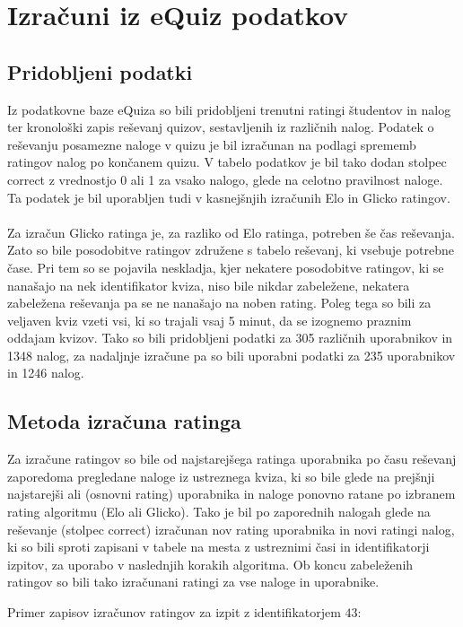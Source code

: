 \documentclass{IEEEtran}
\makeatletter
\let\old@subsection\subsection
\renewcommand{\subsection}[1]{\bigskip\old@subsection{#1}\@afterindentfalse\@afterheading}
\makeatother
\begin{document}
\section{Izračuni iz eQuiz podatkov}
\label{sec:izracuni}
\subsection{Pridobljeni podatki}
Iz podatkovne baze eQuiza so bili pridobljeni trenutni ratingi študentov in nalog ter kronološki zapis reševanj quizov, sestavljenih iz različnih nalog. Podatek o reševanju posamezne naloge v quizu je bil izračunan na podlagi sprememb ratingov nalog po končanem quizu. V tabelo podatkov je bil tako dodan stolpec correct z vrednostjo 0 ali 1 za vsako nalogo, glede na celotno pravilnost naloge. Ta podatek je bil uporabljen tudi v kasnejšnjih izračunih Elo in Glicko ratingov.
\hfill
\\
\\
Za izračun Glicko ratinga je, za razliko od Elo ratinga, potreben še čas reševanja. Zato so bile posodobitve ratingov združene s tabelo reševanj, ki vsebuje potrebne čase. Pri tem so se pojavila neskladja, kjer nekatere posodobitve ratingov, ki se nanašajo na nek identifikator kviza, niso bile nikdar zabeležene, nekatera zabeležena reševanja pa se ne nanašajo na noben rating. Poleg tega so bili za veljaven kviz vzeti vsi, ki so trajali vsaj 5 minut, da se izognemo praznim oddajam kvizov. Tako so bili pridobljeni podatki za 305 različnih uporabnikov in 1348 nalog, za nadaljnje izračune pa so bili uporabni podatki za 235 uporabnikov in 1246 nalog.
\hfill
\\

\subsection{Metoda izračuna ratinga}
Za izračune ratingov so bile od najstarejšega ratinga uporabnika po času reševanj zaporedoma pregledane naloge iz ustreznega kviza, ki so bile glede na prejšnji najstarejši ali (osnovni rating) uporabnika in naloge ponovno ratane po izbranem rating algoritmu (Elo ali Glicko). Tako je bil po zaporednih nalogah glede na reševanje (stolpec correct) izračunan nov rating uporabnika in novi ratingi nalog, ki so bili sproti zapisani v tabele na mesta z ustreznimi časi in identifikatorji izpitov, za uporabo v naslednjih korakih algoritma. Ob koncu zabeleženih ratingov so bili tako izračunani ratingi za vse naloge in uporabnike.

\newpage
Primer zapisov izračunov ratingov za izpit z identifikatorjem $43$:
\end{document}
